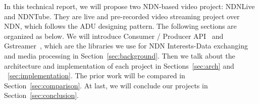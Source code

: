 In this technical report, we will propose two NDN-based video project: NDNLive and NDNTube. They are live and pre-recorded video streaming project over NDN, which follows the ADU designing pattern. The following sections are organized as below. We will introduce Consumer / Producer API~\cite{api-tr} and Gstreamer~\cite{gstreamer}, which are the libraries we use for NDN Interests-Data exchanging and media processing in Section~\ref{sec:background}. Then we talk about the architecture and implementation of each project in Sections~\ref{sec:arch} and ~\ref{sec:implementation}. The prior work will be compared in Section~\ref{sec:comparison}. At last, we will conclude our projects in Section~\ref{sec:conclusion}.

